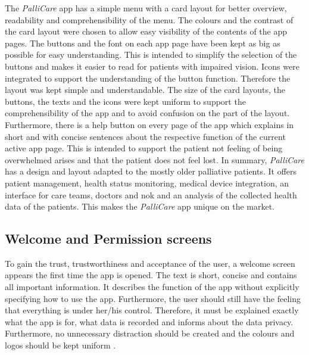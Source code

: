The \textit{PalliCare} app has a simple menu with a card layout for better overview, readability and comprehensibility of the menu. The colours and the contrast of the card layout were chosen to allow easy visibility of the contents of the app pages. The buttons and the font on each app page have been kept as big as possible for easy understanding. This is intended to simplify the selection of the buttons and makes it easier to read for patients with impaired vision. Icons were integrated to support the understanding of the button function. Therefore the layout was kept simple and understandable. The size of the card layouts, the buttons, the texts and the icons were kept uniform to support the comprehensibility of the app and to avoid confusion on the part of the layout. 
Furthermore, there is a help button on every page of the app which explains in short and with concise sentences about the respective function of the current active app page. This is intended to support the patient not feeling of being overwhelmed arises and that the patient does not feel lost. 
\newline In summary, \textit{PalliCare}  has a design and layout adapted to the mostly older palliative patients. It offers patient management, health status monitoring, medical device integration, an interface for care teams, doctors and nok and an analysis of the collected health data of the patients. This makes the \textit{PalliCare} app unique on the market.

\subsection{Welcome and Permission screens}
To gain the trust, trustworthiness and acceptance of the user, a welcome screen appears the first time the app is opened. The text is short, concise and contains all important information. It describes the function of the app without explicitly specifying how to use the app. Furthermore, the user should still have the feeling that everything is under her/his control. Therefore, it must be explained exactly what the app is for, what data is recorded and informs about the data privacy. Furthermore, no unnecessary distraction should be created and the colours and logos should be kept uniform \cite{just, liquide}. 

